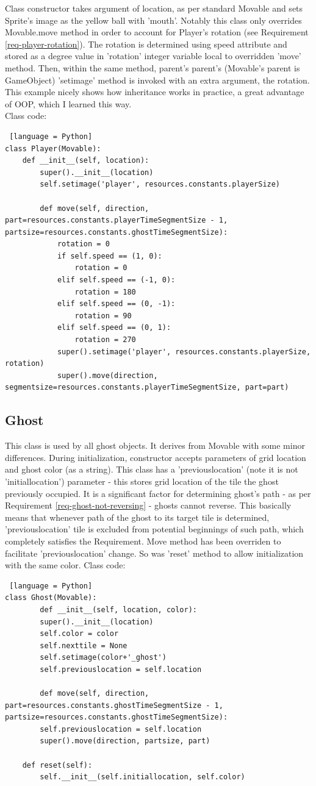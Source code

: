 \documentclass[11pt,a4paper,notitlepage]{report}
\newcommand{\dsubsection}[1]{\FloatBarrier \subsection{#1}}
\begin{document}
				Class constructor takes argument of location, as per standard Movable and sets Sprite's image as the yellow ball with 'mouth'.
				Notably this class only overrides Movable.move method in order to account for Player's rotation (see Requirement \ref{req-player-rotation}). The rotation is determined using speed attribute and stored as a degree value in 'rotation' integer variable local to overridden 'move' method. Then, within the same method, parent's parent's (Movable's parent is GameObject) 'setimage' method is invoked with an extra argument, the rotation. This example nicely shows how inheritance works in practice, a great advantage of OOP, which I learned this way.\\
				Class code:
				\begin{lstlisting} [language = Python]
class Player(Movable):
	def __init__(self, location):
		super().__init__(location)
		self.setimage('player', resources.constants.playerSize)
		
		def move(self, direction, part=resources.constants.playerTimeSegmentSize - 1, partsize=resources.constants.ghostTimeSegmentSize):
			rotation = 0
			if self.speed == (1, 0):
				rotation = 0
			elif self.speed == (-1, 0):
				rotation = 180
			elif self.speed == (0, -1):
				rotation = 90
			elif self.speed == (0, 1):
				rotation = 270
			super().setimage('player', resources.constants.playerSize, rotation)
			super().move(direction, segmentsize=resources.constants.playerTimeSegmentSize, part=part)
				\end{lstlisting}
			\dsubsection{Ghost}
				This class is used by all ghost objects. It derives from Movable with some minor differences. 
				During initialization, constructor accepts parameters of grid location and ghost color (as a string).
				This class has a 'previouslocation' (note it is not 'initiallocation') parameter - this stores grid location of the tile the ghost previously occupied. It is a significant factor for determining ghost's path - as per Requirement \ref{req-ghost-not-reversing} - ghosts cannot reverse. This basically means that whenever path of the ghost to its target tile is determined, 'previouslocation' tile is excluded from potential beginnings of such path, which completely satisfies the Requirement. Move method has been overriden to facilitate 'previouslocation' change. So was 'reset' method to allow initialization with the same color.
				Class code:
				\begin{lstlisting} [language = Python]
class Ghost(Movable):
		def __init__(self, location, color):
		super().__init__(location)
		self.color = color
		self.nexttile = None
		self.setimage(color+'_ghost')
		self.previouslocation = self.location
	
		def move(self, direction, part=resources.constants.ghostTimeSegmentSize - 1, partsize=resources.constants.ghostTimeSegmentSize):
		self.previouslocation = self.location
		super().move(direction, partsize, part)
	
	def reset(self):
		self.__init__(self.initiallocation, self.color)
				\end{lstlisting}
\end{document}
